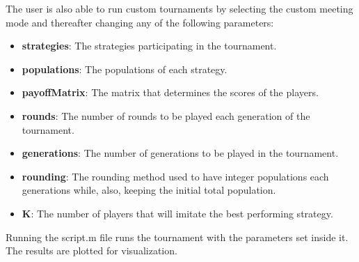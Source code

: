 \documentclass[12pt]{report}
\begin{document}
The user is also able to run custom tournaments by selecting the custom meeting mode and thereafter changing any of the following parameters:
\begin{itemize}
    \item \textbf{strategies}: The strategies participating in the tournament. 
    \item \textbf{populations}: The populations of each strategy.
    \item \textbf{payoffMatrix}: The matrix that determines the scores of the players.
    \item \textbf{rounds}: The number of rounds to be played each generation of the tournament.
    \item \textbf{generations}: The number of generations to be played in the tournament.
    \item \textbf{rounding}: The rounding method used to have integer populations each generations while, also, keeping the initial total population.
    \item \textbf{K}: The number of players that will imitate the best performing strategy.
\end{itemize}
Running the script.m file runs the tournament with the parameters set inside it. The results are plotted for visualization.
\end{document}
